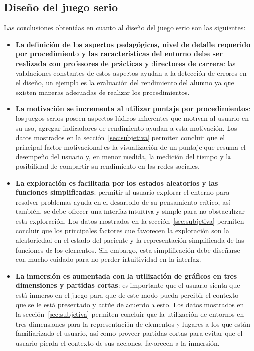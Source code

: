 \subsection{Diseño del juego serio}

Las conclusiones obtenidas en cuanto al diseño del juego serio son las siguientes:

\begin{itemize}

\item \textbf{La definición de los aspectos pedagógicos, nivel de detalle requerido por procedimiento y las características del entorno debe ser realizada con profesores de prácticas y directores de carrera}: las validaciones constantes de estos aspectos ayudan a la detección de errores en el diseño, un ejemplo es la evaluación del rendimiento del alumno ya que existen maneras adecuadas de realizar los procedimientos.

\item \textbf{La motivación se incrementa al utilizar puntaje por procedimientos}: los juegos serios poseen aspectos lúdicos inherentes que motivan al usuario en su uso, agregar indicadores de rendimiento ayudan a esta motivación. Los datos mostrados en la sección~\ref{sec:subjetiva} permiten concluir que el principal factor motivacional es la visualización de un puntaje que resuma el desempeño del usuario y, en menor medida, la medición del tiempo y la posibilidad de compartir su rendimiento en las redes sociales. 

\item \textbf{La exploración es facilitada por los estados aleatorios y las funciones simplificadas}: permitir al usuario explorar el entorno para resolver problemas ayuda en el desarrollo de su pensamiento crítico, así también, se debe ofrecer una interfaz intuitiva y simple para no obstaculizar esta exploración. Los datos mostrados en la sección~\ref{sec:subjetiva} permiten concluir que los principales factores que favorecen la exploración son la aleatoriedad en el estado del paciente y la representación simplificada de las funciones de los elementos. Sin embargo, esta simplificación debe diseñarse con mucho cuidado para no perder intuitividad en la interfaz. 

\item \textbf{La inmersión es aumentada con la utilización de gráficos en tres dimensiones y partidas cortas}: es importante que el usuario sienta que está inmerso en el juego para que de este modo pueda percibir el contexto que se le está presentado y actúe de acuerdo a esto. Los datos mostrados en la sección~\ref{sec:subjetiva} permiten concluir que la utilización de entornos en tres dimensiones para la representación de elementos y lugares a los que están familiarizado el usuario, así como proveer partidas cortas para evitar que el usuario pierda el contexto de sus acciones, favorecen a la inmersión. 


\end{itemize}
